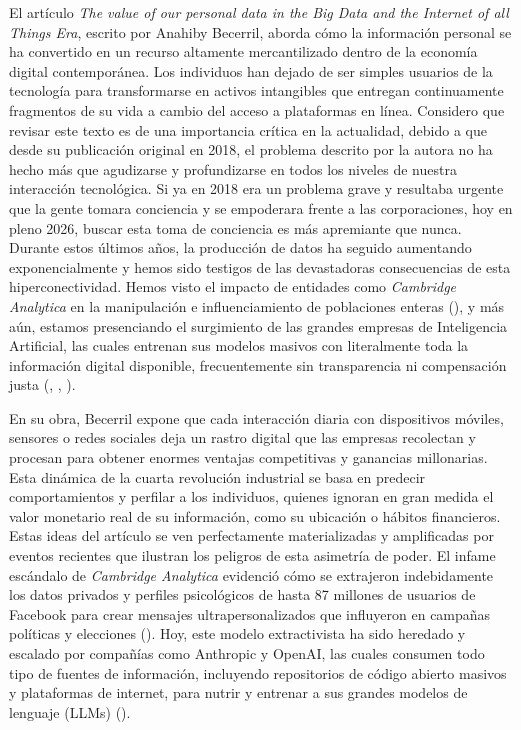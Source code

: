 El artículo \emph{The value of our personal data in the Big Data and the Internet of all Things Era}, escrito por Anahiby Becerril, aborda cómo la información personal se ha convertido en un recurso altamente mercantilizado dentro de la economía digital contemporánea.
Los individuos han dejado de ser simples usuarios de la tecnología para transformarse en activos intangibles que entregan continuamente fragmentos de su vida a cambio del acceso a plataformas en línea.
Considero que revisar este texto es de una importancia crítica en la actualidad, debido a que desde su publicación original en 2018, el problema descrito por la autora no ha hecho más que agudizarse y profundizarse en todos los niveles de nuestra interacción tecnológica.
Si ya en 2018 era un problema grave y resultaba urgente que la gente tomara conciencia y se empoderara frente a las corporaciones, hoy en pleno 2026, buscar esta toma de conciencia es más apremiante que nunca.
Durante estos últimos años, la producción de datos ha seguido aumentando exponencialmente y hemos sido testigos de las devastadoras consecuencias de esta hiperconectividad.
Hemos visto el impacto de entidades como \emph{Cambridge Analytica} en la manipulación e influenciamiento de poblaciones enteras (\cite{cadwalladr2018cambridge}), y más aún, estamos presenciando el surgimiento de las grandes empresas de Inteligencia Artificial, las cuales entrenan sus modelos masivos con literalmente toda la información digital disponible, frecuentemente sin transparencia ni compensación justa (\cite{grynbaum2023nyt}, \cite{genai}, \cite{guild}).

En su obra, Becerril expone que cada interacción diaria con dispositivos móviles, sensores o redes sociales deja un rastro digital que las empresas recolectan y procesan para obtener enormes ventajas competitivas y ganancias millonarias.
Esta dinámica de la cuarta revolución industrial se basa en predecir comportamientos y perfilar a los individuos, quienes ignoran en gran medida el valor monetario real de su información, como su ubicación o hábitos financieros.
Estas ideas del artículo se ven perfectamente materializadas y amplificadas por eventos recientes que ilustran los peligros de esta asimetría de poder.
El infame escándalo de \emph{Cambridge Analytica} evidenció cómo se extrajeron indebidamente los datos privados y perfiles psicológicos de hasta 87 millones de usuarios de Facebook para crear mensajes ultrapersonalizados que influyeron en campañas políticas y elecciones (\cite{cadwalladr2018cambridge}).
Hoy, este modelo extractivista ha sido heredado y escalado por compañías como Anthropic y OpenAI, las cuales consumen todo tipo de fuentes de información, incluyendo repositorios de código abierto masivos y plataformas de internet, para nutrir y entrenar a sus grandes modelos de lenguaje (LLMs) (\cite{grynbaum2023nyt}).


